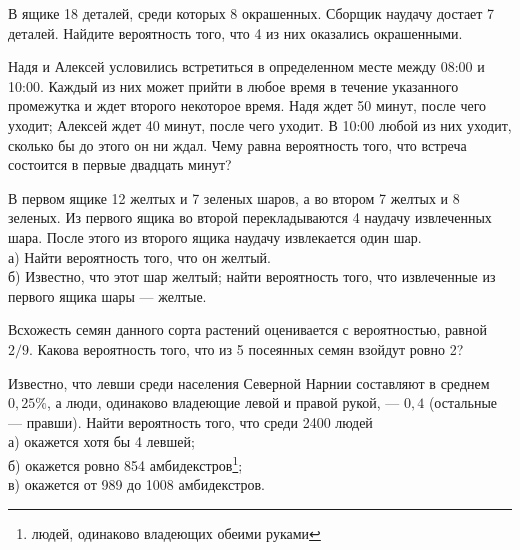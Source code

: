 \newpage\setcounter{zad}{0}



\begin{zkrW}{20}\noindent 
	В ящике 18 деталей, среди которых 8 окрашенных. Сборщик наудачу достает 7 деталей. Найдите вероятность того, что 4 из них оказались окрашенными. 
 
\end{zkrW}

\begin{zkrW}{20}\noindent 
	Надя и Алексей условились встретиться в определенном месте между 08:00 и 10:00. Каждый из них может прийти в любое время в течение указанного промежутка и ждет второго некоторое время. Надя ждет 50 минут, после чего уходит; Алексей ждет 40 минут, после чего уходит. В 10:00 любой из них уходит, сколько бы до этого он ни ждал. Чему равна вероятность того, что встреча состоится в первые двадцать минут?
 
\end{zkrW}

\begin{zkrW}{20}\noindent 
	В первом ящике 12 желтых и 7 зеленых шаров, а во втором 7 желтых и 8 зеленых. Из первого ящика во второй перекладываются 4 наудачу извлеченных шара. После этого из второго ящика наудачу извлекается один шар. \\ \indent а) Найти вероятность того, что он желтый. \\ \indent б) Известно, что этот шар желтый; найти вероятность того, что извлеченные из первого ящика шары --- желтые.
 
\end{zkrW}

\begin{zkrW}{20}\noindent 
	Всхожесть семян данного сорта растений оценивается с вероятностью, равной $2/9$. Какова вероятность того, что из 5 посеянных семян взойдут ровно 2?
 
\end{zkrW}

\begin{zkrW}{20}\noindent 
	Известно, что левши среди населения Северной Нарнии составляют в среднем $0{,}25\%$, а люди, одинаково владеющие левой и правой рукой, --- $0{,}4$ (остальные --- правши). Найти вероятность того, что среди 2400 людей \\ \indent а) окажется хотя бы 4 левшей; \\ \indent б) окажется ровно 854 амбидекстров\footnote{людей, одинаково владеющих обеими руками}; \\ \indent в) окажется от 989 до 1008 амбидекстров.
 
\end{zkrW}

